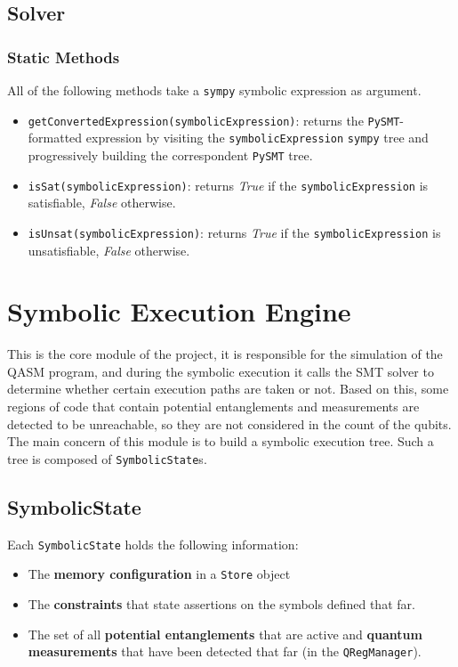 \documentclass[12pt,a4paper]{report}
\theoremstyle{definition}
\theoremstyle{definition}
\theoremstyle{definition}
\begin{document}
\pagebreak

\subsection{Solver}
\subsubsection{Static Methods}
All of the following methods take a \texttt{sympy} symbolic expression as argument.
\begin{itemize}
    \itemsep 0em
    \item \texttt{getConvertedExpression(symbolicExpression)}: returns the \texttt{PySMT}-formatted expression by visiting the \texttt{symbolicExpression} \texttt{sympy} tree and progressively building the correspondent \texttt{PySMT} tree.
    \item \texttt{isSat(symbolicExpression)}: returns \textit{True} if the \texttt{symbolicExpression} is satisfiable, \textit{False} otherwise.
    \item \texttt{isUnsat(symbolicExpression)}: returns \textit{True} if the \texttt{symbolicExpression} is unsatisfiable, \textit{False} otherwise.
\end{itemize}


\section{Symbolic Execution Engine}
This is the core module of the project, it is responsible for the simulation of the QASM program, and during the symbolic execution it calls the SMT solver to determine whether certain execution paths are taken or not. Based on this, some regions of code that contain potential entanglements and measurements are detected to be unreachable, so they are not considered in the count of the qubits.
The main concern of this module is to build a symbolic execution tree. Such a tree is composed of \texttt{SymbolicState}s.

\subsection{SymbolicState}
Each \texttt{SymbolicState} holds the following information:
\begin{itemize}
    \itemsep 0em
    \item The \textbf{memory configuration} in a \texttt{Store} object
    \item The \textbf{constraints} that state assertions on the symbols defined that far.
    \item The set of all \textbf{potential entanglements} that are active and \textbf{quantum measurements} that have been detected that far (in the \texttt{QRegManager}).
\end{itemize}
\end{document}
